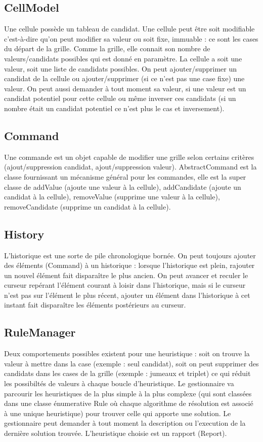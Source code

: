 \subsection{CellModel}
Une cellule possède un tableau de candidat.
Une cellule peut être soit modifiable c'est-à-dire qu'on peut modifier sa valeur ou soit fixe, immuable : 
ce sont les cases du départ de la grille. 
Comme la grille, elle connait son nombre de valeurs/candidats possibles qui est donné en paramètre.
La cellule a soit une valeur, soit une liste de candidats possibles. 
On peut ajouter/supprimer un candidat de la cellule ou ajouter/supprimer (si ce 
n'est pas une case fixe) une valeur. On peut aussi demander à tout moment sa valeur, si une valeur est un candidat
potentiel pour cette cellule ou même inverser ces candidats (si un nombre était un candidat potentiel ce n'est plus
le cas et inversement).

\subsection{Command}
Une commande est un objet capable de modifier une grille selon certains critères (ajout/suppression candidat, ajout/suppression valeur).
AbstractCommand est la classe fournissant un mécanisme général pour les commandes, elle est la super classe de 
addValue (ajoute une valeur à la cellule), addCandidate (ajoute un candidat à la cellule),
removeValue (supprime une valeur à la cellule), removeCandidate (supprime un candidat à la cellule).

\subsection{History}
L'historique est une sorte de pile chronologique bornée. On peut toujours ajouter des éléments (Command) à un historique : lorsque l'historique est plein, rajouter un nouvel élément fait disparaître le plus ancien. On peut avancer et 
reculer le curseur repérant l'élément courant à loisir dans l'historique, mais si le curseur n'est pas sur l'élément le 
plus récent, ajouter un élément dans l'historique à cet instant fait disparaître les éléments postérieurs au curseur.

\subsection{RuleManager}
Deux comportements possibles existent pour une heuristique : soit on trouve la valeur à mettre dans la case 
(exemple : seul candidat), soit on peut supprimer des candidats dans les cases de la grille (exemple : jumeaux et triplet)
ce qui réduit les possibiltés de valeurs à chaque boucle d'heuristique.
Le gestionnaire va parcourir les heuristiques de la plus simple à la plus complexe (qui sont classées dans une classe énumerative Rule où
chaque algorithme de résolution est associé à une unique heuristique) pour trouver celle qui apporte une solution.
Le gestionnaire peut demander à tout moment la description ou l'execution de la dernière solution trouvée.
L'heuristique choisie est un rapport (Report).

